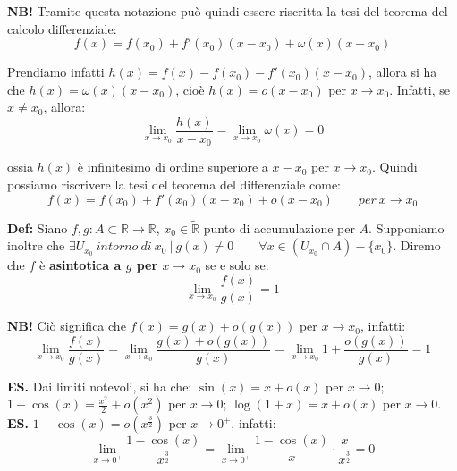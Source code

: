 \documentclass{article}
\begin{document}
\noindent\textbf{NB!} Tramite questa notazione può quindi essere riscritta la tesi del teorema del calcolo differenziale:
\begin{equation*}
    f(x) = f(x_0) + f'(x_0)(x - x_0) + \omega(x)(x - x_0)
\end{equation*}

\noindent Prendiamo infatti $h(x) = f(x) - f(x_0) - f'(x_0)(x - x_0)$, allora si ha che $h(x) = \omega(x)(x - x_0)$, cioè $h(x) = o(x - x_0)$ per $x \to x_0$. Infatti, se $x \neq x_0$, allora:
\begin{equation*}
    \lim_{x \to x_0} \frac{h(x)}{x - x_0} = \lim_{x \to x_0} \omega(x) = 0
\end{equation*}

\noindent ossia $h(x)$ è infinitesimo di ordine superiore a $x - x_0$ per $x \to x_0$. Quindi possiamo riscrivere la tesi del teorema del differenziale come:
\begin{equation*}
    f(x) = f(x_0) + f'(x_0)(x - x_0) + o(x -x_0) \qquad per \ x \to x_0
\end{equation*}

\noindent\textbf{Def:} Siano $f, g: A \subset \mathbb{R} \xrightarrow{} \mathbb{R}$, $x_0 \in \widetilde{\mathbb{R}}$ punto di accumulazione per $A$. Supponiamo inoltre che $\exists U_{x_0} \ intorno \ di \ x_0 \ | \ g(x) \neq 0 \qquad \forall x \in (U_{x_0} \cap A) - \{x_0\}$. Diremo che $f$ è \textbf{asintotica a $g$ per $x \to x_0$} se e solo se:
\begin{equation*}
    \lim_{x \to x_0} \frac{f(x)}{g(x)} = 1
\end{equation*}

\noindent\textbf{NB!} Ciò significa che $f(x) = g(x) + o(g(x))$ per $x \to x_0$, infatti:
\begin{equation*}
    \lim_{x \to x_0} \frac{f(x)}{g(x)} = \lim_{x \to x_0} \frac{g(x) + o(g(x))}{g(x)} = \lim_{x \to x_0} 1 + \frac{o(g(x))}{g(x)} = 1
\end{equation*}

\noindent\textbf{ES.} Dai limiti notevoli, si ha che: $\sin(x) = x + o(x)$ per $x \to 0$; $1 - \cos(x) = \frac{x^2}{2} + o(x^2)$ per $x \to 0$; $\log(1 + x) = x + o(x)$ per $x \to 0$. \\

\noindent\textbf{ES.} $1 - \cos(x) = o(x^\frac{3}{2})$ per $x \to 0^+$, infatti:
\begin{equation*}
    \lim_{x \to 0^+} \frac{1 - \cos(x)}{x^\frac{3}{2}} = \lim_{x \to 0^+} \frac{1 - \cos(x)}{x} \cdot \frac{x}{x^\frac{3}{2}} = 0
\end{equation*}
\end{document}
